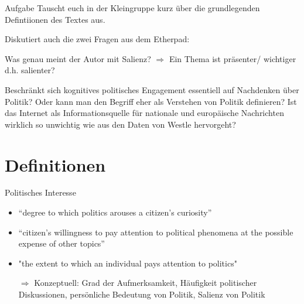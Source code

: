 \documentclass[11pt]{beamer}
\begin{document}
\begin{frame}{Aufgabe}
Tauscht euch in der Kleingruppe kurz über die grundlegenden Defintiionen des Textes aus. 

Diskutiert auch die zwei Fragen aus dem Etherpad:
\begin{nolist}
	\item Was genau meint der Autor mit Salienz? $\Rightarrow$ Ein Thema ist präsenter/ wichtiger d.h. salienter?
	\item Beschränkt sich kognitives politisches Engagement essentiell auf Nachdenken über Politik? Oder kann man den Begriff eher als Verstehen von Politik definieren? Ist das Internet als Informationsquelle für nationale und europäische Nachrichten wirklich so unwichtig wie aus den Daten von Westle hervorgeht?
\end{nolist}

 
\end{frame}

\section{Definitionen}


\begin{frame}[t]{Politisches Interesse}
			 \pause
			\begin{itemize}
				\item “degree to which politics arouses a citizen’s curiosity” \parencite[278]{vanDeth1990}
				\item “citizen’s willingness to pay attention to political phenomena at the possible expense of other topics” \parencite[1122]{Lupia2005}
				\item "the extent to which an individual pays attention to politics" \parencite[21]{Zaller1992} \pause
				\item[$\Rightarrow$] Konzeptuell: Grad der Aufmerksamkeit, Häufigkeit politischer Diskussionen, persönliche Bedeutung von Politik, Salienz von Politik
			\end{itemize}
		\end{frame}

\end{document}
